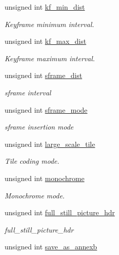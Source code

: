 \begin{DoxyCompactItemize}
unsigned int \hyperlink{structaom__codec__enc__cfg_a5df0104b97c8ad18f8f1df492706a256}{kf\+\_\+min\+\_\+dist}
\begin{DoxyCompactList}\small\item\em Keyframe minimum interval. \end{DoxyCompactList}\item 
unsigned int \hyperlink{structaom__codec__enc__cfg_a877936e8a60207e7eac223811af0c124}{kf\+\_\+max\+\_\+dist}
\begin{DoxyCompactList}\small\item\em Keyframe maximum interval. \end{DoxyCompactList}\item 
unsigned int \hyperlink{structaom__codec__enc__cfg_aa72f5e8f1508388778175d8075e15195}{sframe\+\_\+dist}
\begin{DoxyCompactList}\small\item\em sframe interval \end{DoxyCompactList}\item 
unsigned int \hyperlink{structaom__codec__enc__cfg_aab919adaf0e01b41da93505a075b6804}{sframe\+\_\+mode}
\begin{DoxyCompactList}\small\item\em sframe insertion mode \end{DoxyCompactList}\item 
unsigned int \hyperlink{structaom__codec__enc__cfg_af4583da6c145778f822a4a61db28c40a}{large\+\_\+scale\+\_\+tile}
\begin{DoxyCompactList}\small\item\em Tile coding mode. \end{DoxyCompactList}\item 
unsigned int \hyperlink{structaom__codec__enc__cfg_a71d97f2a1ff3850955c50705104ac54a}{monochrome}
\begin{DoxyCompactList}\small\item\em Monochrome mode. \end{DoxyCompactList}\item 
unsigned int \hyperlink{structaom__codec__enc__cfg_a35b8433fa60af32d0aecc2b56e736a98}{full\+\_\+still\+\_\+picture\+\_\+hdr}
\begin{DoxyCompactList}\small\item\em full\+\_\+still\+\_\+picture\+\_\+hdr \end{DoxyCompactList}\item 
unsigned int \hyperlink{structaom__codec__enc__cfg_adb3fe41c1ce39579a49b97bc2ca7b2f2}{save\+\_\+as\+\_\+annexb}

\end{DoxyCompactItemize}
